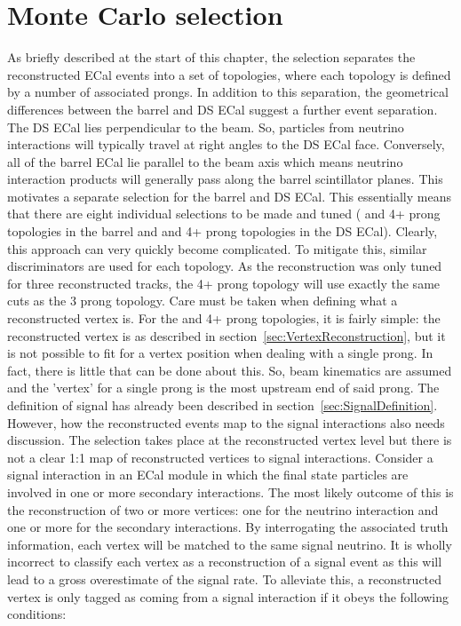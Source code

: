 \section{Monte Carlo selection}
As briefly described at the start of this chapter, the selection separates the reconstructed ECal events into a set of topologies, where each topology is defined by a number of associated prongs.  In addition to this separation, the geometrical differences between the barrel and DS ECal suggest a further event separation.  The DS ECal lies perpendicular to the beam.  So, particles from neutrino interactions will typically travel at right angles to the DS ECal face.  Conversely, all of the barrel ECal lie parallel to the beam axis which means neutrino interaction products will generally pass along the barrel scintillator planes.  This motivates a separate selection for the barrel and DS ECal.  This essentially means that there are eight individual selections to be made and tuned ( and 4+ prong topologies in the barrel and  and 4+ prong topologies in the DS ECal).  Clearly, this approach can very quickly become complicated.  To mitigate this, similar discriminators are used for each topology.  As the reconstruction was only tuned for three reconstructed tracks, the 4+ prong topology will use exactly the same cuts as the 3 prong topology.
\newline
\newline
Care must be taken when defining what a reconstructed vertex is.  For the  and 4+ prong topologies, it is fairly simple: the reconstructed vertex is as described in section~\ref{sec:VertexReconstruction}, but it is not possible to fit for a vertex position when dealing with a single prong.  In fact, there is little that can be done about this.  So, beam kinematics are assumed and the 'vertex' for a single prong is the most upstream end of said prong.
\newline
\newline
The definition of signal has already been described in section~\ref{sec:SignalDefinition}.  However, how the reconstructed events map to the signal interactions also needs discussion.  The selection takes place at the reconstructed vertex level but there is not a clear 1:1 map of reconstructed vertices to signal interactions.  Consider a signal interaction in an ECal module in which the final state particles are involved in one or more secondary interactions.  The most likely outcome of this is the reconstruction of two or more vertices: one for the neutrino interaction and one or more for the secondary interactions.  By interrogating the associated truth information, each vertex will be matched to the same signal neutrino.  It is wholly incorrect to classify each vertex as a reconstruction of a signal event as this will lead to a gross overestimate of the signal rate.  To alleviate this,  a reconstructed vertex is only tagged as coming from a signal interaction if it obeys the following conditions:
